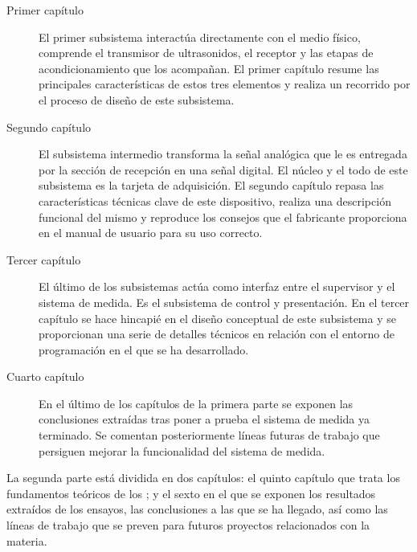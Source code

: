 \begin{description}
	\item[Primer capítulo] El primer subsistema interactúa directamente
		con el medio físico, comprende el transmisor de
		ultrasonidos, el receptor y las etapas de acondicionamiento
		que los acompañan. El primer capítulo resume las
		principales características de estos tres elementos y
		realiza un recorrido por el proceso de diseño de este
		subsistema.
	\item[Segundo capítulo] El subsistema intermedio transforma la
		señal analógica que le es entregada por la sección de
		recepción en una señal digital.  El núcleo y el todo de
		este subsistema es la tarjeta de adquisición. El segundo
		capítulo repasa las características técnicas clave de este
		dispositivo, realiza una descripción funcional del mismo y
		reproduce los consejos que el fabricante proporciona en el
		manual de usuario para su uso correcto.
	\item[Tercer capítulo] El último de los subsistemas actúa como
		interfaz entre el supervisor y el sistema de medida. Es el
		subsistema de control y presentación. En el tercer capítulo
		se hace hincapié en el diseño conceptual de este subsistema
		y se proporcionan una serie de detalles técnicos en
		relación con el entorno de programación en el que se ha
		desarrollado.
	\item[Cuarto capítulo] En el último de los capítulos de la primera
		parte se exponen las conclusiones extraídas tras poner a
		prueba el sistema de medida ya terminado. Se comentan
		posteriormente líneas futuras de trabajo que persiguen
		mejorar la funcionalidad del sistema de medida.
\end{description}

La segunda parte está dividida en dos capítulos: el quinto capítulo que
trata los fundamentos teóricos de los ; y el sexto en el que se
exponen los resultados extraídos de los ensayos, las conclusiones a las que
se ha llegado, así como las líneas de trabajo que se preven para futuros
proyectos relacionados con la materia.%


